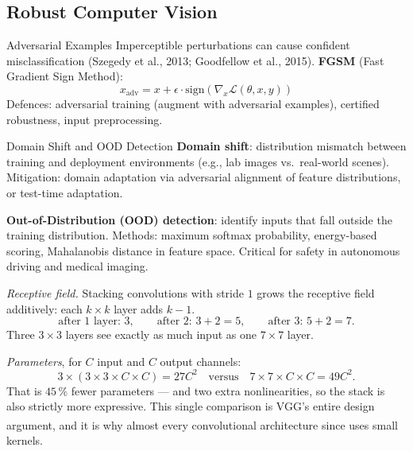 \subsection{Robust Computer Vision}

\begin{v3topic}{Adversarial Examples}
    Imperceptible perturbations can cause confident misclassification (Szegedy et al., 2013; Goodfellow et al., 2015).
    \textbf{FGSM} (Fast Gradient Sign Method):
    \begin{equation}
        x_{\mathrm{adv}} = x + \epsilon \cdot \mathrm{sign}\!\left(\nabla_x \mathcal{L}(\theta, x, y)\right)
    \end{equation}
    Defences: adversarial training (augment with adversarial examples), certified robustness, input preprocessing.

\end{v3topic}
\begin{v3topic}{Domain Shift and OOD Detection}
    \textbf{Domain shift}: distribution mismatch between training and deployment environments (e.g., lab images vs.\ real-world scenes).
    Mitigation: domain adaptation via adversarial alignment of feature distributions, or test-time adaptation.

    \textbf{Out-of-Distribution (OOD) detection}: identify inputs that fall outside the training distribution.
    Methods: maximum softmax probability, energy-based scoring, Mahalanobis distance in feature space.
    Critical for safety in autonomous driving and medical imaging.
\end{v3topic}


%
\begin{workedexample}
\emph{Receptive field.} Stacking convolutions with stride $1$ grows the
receptive field additively: each $k\times k$ layer adds $k-1$.
\[
  \text{after 1 layer: } 3,\qquad
  \text{after 2: } 3+2 = 5,\qquad
  \text{after 3: } 5+2 = 7 .
\]
Three $3\times3$ layers see exactly as much input as one $7\times7$ layer.

\emph{Parameters}, for $C$ input and $C$ output channels:
\[
  3\times(3\times3\times C\times C) = 27C^2
  \quad\text{versus}\quad
  7\times7\times C\times C = 49C^2 .
\]
That is $45\,\%$ fewer parameters --- and two extra nonlinearities, so the
stack is also strictly more expressive. This single comparison is VGG's entire
design argument\textsuperscript{\cite{simonyanVeryDeepConvolutional2015}}, and
it is why almost every convolutional architecture since uses small kernels.
\end{workedexample}

